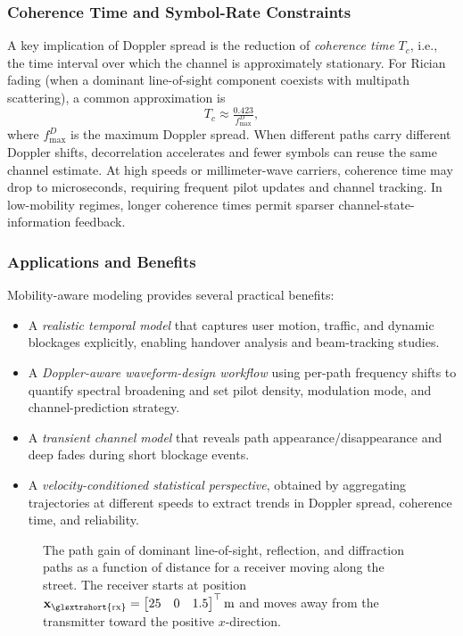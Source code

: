 \subsubsection{Coherence Time and Symbol-Rate Constraints}

A key implication of Doppler spread is the reduction of \emph{coherence time} $T_c$, i.e., the time interval over which the channel is approximately stationary. For Rician fading (when a dominant \gls{line-of-sight} component coexists with multipath scattering), a common approximation is
\begin{equation}
  T_c \approx \tfrac{0.423}{f_{\text{max}}^D},
\end{equation}
where $f_{\text{max}}^D$ is the maximum Doppler spread. When different paths carry different Doppler shifts, decorrelation accelerates and fewer symbols can reuse the same channel estimate. At high speeds or millimeter-wave carriers, coherence time may drop to microseconds, requiring frequent pilot updates and channel tracking. In low-mobility regimes, longer coherence times permit sparser channel-state-information feedback.

\subsubsection{Applications and Benefits}

Mobility-aware modeling provides several practical benefits:
\begin{itemize}
  \item A \emph{realistic temporal model} that captures user motion, traffic, and dynamic blockages explicitly, enabling handover analysis and beam-tracking studies.
  \item A \emph{Doppler-aware waveform-design workflow} using per-path frequency shifts to quantify spectral broadening and set pilot density, modulation mode, and channel-prediction strategy.
  \item A \emph{transient channel model} that reveals path appearance/disappearance and deep fades during short blockage events.
  \item A \emph{velocity-conditioned statistical perspective}, obtained by aggregating trajectories at different speeds to extract trends in Doppler spread, coherence time, and reliability.
\end{itemize}

\begin{figure}
  \caption{The path gain of dominant \gls{line-of-sight}, reflection, and diffraction paths as a function of distance for a receiver moving along the street. The receiver starts at position $\bsup{x}_\text{\glsxtrshort{rx}} =
    \begin{bmatrix}25 & 0 & 1.5
  \end{bmatrix}^\top \unit{\meter}$ and moves away from the transmitter toward the positive $x$-direction.}
\end{figure}


